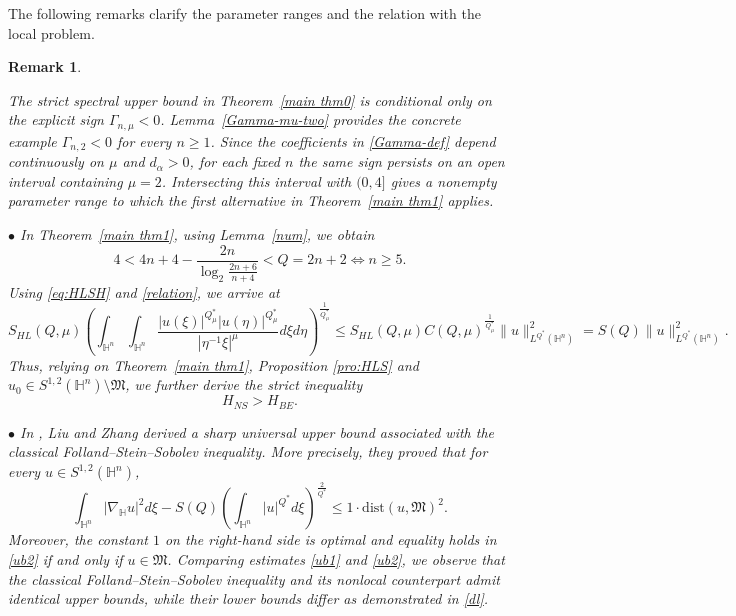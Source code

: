 \documentclass[11pt]{article}
\newtheorem{remark}{Remark}[section]
\begin{document}
{The following remarks clarify the parameter ranges and the relation with the local problem.}
\begin{remark}\label{rmk2}
{\rm
{The strict spectral upper bound in Theorem~\ref{main thm0} is conditional only on the explicit sign $\Gamma_{n,\mu}<0$. Lemma~\ref{Gamma-mu-two} provides the concrete example $\Gamma_{n,2}<0$ for every $n\ge1$. Since the coefficients in \eqref{Gamma-def} depend continuously on $\mu$ and $d_\alpha>0$, for each fixed $n$ the same sign persists on an open interval containing $\mu=2$. Intersecting this interval with $(0,4]$ gives a nonempty parameter range to which the first alternative in Theorem~\ref{main thm1} applies.}

$\bullet$ In Theorem~\ref{main thm1}, using Lemma~\ref{num}, we obtain
\begin{equation*}
 4<4n+4-\frac{2n}{\log_2 \frac{2n+6}{n+4}}<Q=2n+2\Longleftrightarrow n\geq5.
\end{equation*}
Using \eqref{eq:HLSH} and \eqref{relation}, we arrive at
\begin{equation*}
 S_{HL}(Q,\mu) \left(\int_{\mathbb{H}^{n}}\int_{\mathbb{H}^{n}}\frac{|u(\xi)|^{Q^{\ast}_{\mu}}|u(\eta)|
^{Q^{\ast}_{\mu}}}{|\eta^{-1}\xi|^{\mu}}{d}\xi{d}\eta\right)^{\frac{1}{Q^{\ast}_{\mu}}}\leq
S_{HL}(Q,\mu) C(Q,\mu)^{\frac{1}{Q^{\ast}_{\mu}}} \|u\|_{L^{Q^{\ast}}(\mathbb{H}^n)}^2=S(Q)\|u\|_{L^{Q^{\ast}}(\mathbb{H}^n)}^2.
\end{equation*}
Thus, relying on Theorem~\ref{main thm1}, Proposition \ref{pro:HLS} and $u_0\in S^{1,2}(\mathbb{H}^{n})\setminus \mathfrak{M}$, we further derive the strict inequality
\begin{equation}\label{dl}
 H_{NS}>H_{BE}.
\end{equation}


$\bullet$ In \cite{LZ15}, Liu and Zhang derived a sharp universal upper bound associated with the classical Folland--Stein--Sobolev inequality. More precisely, they proved that
for every $u\in S^{1,2}(\mathbb{H}^{n})$,
\begin{equation}\label{ub2}
 \int_{\mathbb{H}^{n}}|\nabla_{\mathbb{H}} u|^{2}{d}\xi-S(Q)\left(\int_{\mathbb{H}^{n}}|u|^{Q^{\ast}}d\xi\right)^{\frac{2}{Q^{\ast}}}\leq 1\cdot \mathrm{dist}(u,\mathfrak{M})^2.
\end{equation}
Moreover, the constant $1$ on the right-hand side is optimal and equality holds in \eqref{ub2} if and only if $u\in \mathfrak{M}$. Comparing estimates \eqref{ub1} and \eqref{ub2}, we observe that the classical Folland--Stein--Sobolev inequality and its nonlocal counterpart admit identical upper bounds, while their lower bounds differ as demonstrated in \eqref{dl}.
}
\end{remark}
\end{document}
